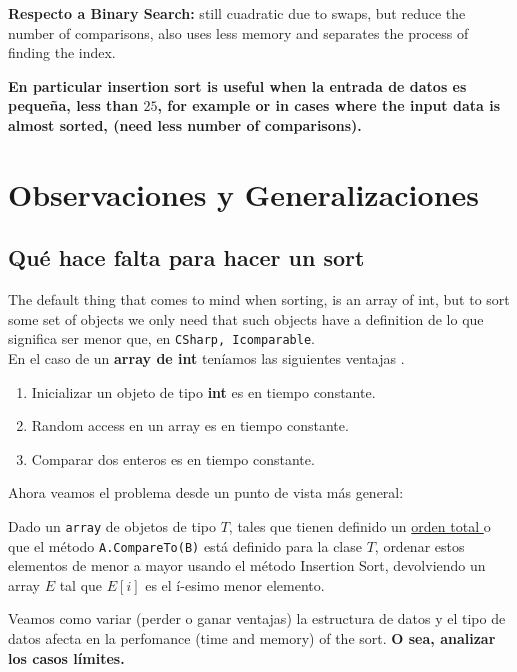\documentclass[14pt]{extarticle}
\begin{document}
\textbf{Respecto a Binary Search:} still cuadratic due to swaps, but reduce the number of comparisons, also uses less memory and separates the process of finding the index.

\textbf{En particular insertion sort is useful when la entrada de datos es pequeña, less than $25$, for example or in cases where the input data is almost sorted, (need less number of comparisons).}

\section{Observaciones y Generalizaciones}

\subsection{Qué hace falta para hacer un sort}

The default thing that comes to mind when sorting, is an array of int, but to sort some set of objects we only need that such objects have a definition de lo que significa ser menor que, en \texttt{CSharp, Icomparable}.     \\ 

En el caso de un \textbf{array de int} teníamos las siguientes ventajas . 

\begin{enumerate}
    \item Inicializar un objeto de tipo \textbf{int} es en tiempo constante.
    \item Random access en un array es en tiempo constante.
    \item Comparar dos enteros es en tiempo constante.
\end{enumerate}

Ahora veamos el problema desde un punto de vista más general:

\begin{tcolorbox}[colback=blue!5!white,colframe=blue!75!black, title = Generalized Insertion Sort]
Dado un \texttt{array} de objetos de tipo $T$, tales que tienen definido un \hyperref[sec:Referencias]{orden total } o que el método \texttt{A.CompareTo(B)} está definido para la clase $T$, ordenar estos elementos de menor a mayor usando el método Insertion Sort, devolviendo un array $E$ tal que $E[i]$ es el í-esimo menor elemento.
    \end{tcolorbox}

Veamos como variar (perder o ganar ventajas) la estructura de datos y el tipo de datos afecta en la perfomance (time and memory) of the sort. \textbf{O sea, analizar los casos límites.}
\end{document}
